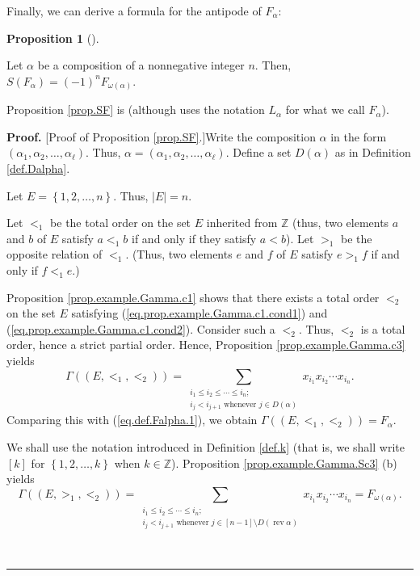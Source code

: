 \documentclass[numbers=enddot,12pt,final,onecolumn,notitlepage,abstracton]{scrartcl}
\theoremstyle{definition}
\newtheorem{prop}[theo]{Proposition}
\newenvironment{proposition}[1][]
{\begin{prop}[#1]\begin{leftbar}}
{\end{leftbar}\end{prop}}
\newenvironment{proof}[1][Proof]{\noindent\textbf{#1.} }{\ \rule{0.5em}{0.5em}}
\let\sumnonlimits\sum
\renewcommand{\sum}{\sumnonlimits\limits}
\newenvironment{verlong}{}{}
\begin{document}
\begin{verlong}
\begin{footnotesize}
Finally, we can derive a formula for the antipode of $F_{\alpha}$:

\begin{proposition}
\label{prop.SF}Let $\alpha$ be a composition of a nonnegative integer $n$.
Then, $S\left(  F_{\alpha}\right)  =\left(  -1\right)  ^{n}F_{\omega\left(
\alpha\right)  }$.
\end{proposition}

Proposition \ref{prop.SF} is \cite[(5.2.7)]{Reiner} (although \cite{Reiner} uses
the notation $L_{\alpha}$ for what we call $F_{\alpha}$).

\begin{proof}
[Proof of Proposition \ref{prop.SF}.]Write the composition $\alpha$ in the
form $\left(  \alpha_{1},\alpha_{2},\ldots,\alpha_{\ell}\right)  $. Thus,
$\alpha=\left(  \alpha_{1},\alpha_{2},\ldots,\alpha_{\ell}\right)  $. Define a
set $D\left(  \alpha\right)  $ as in Definition \ref{def.Dalpha}.

Let $E=\left\{  1,2,\ldots,n\right\}  $. Thus, $\left\vert E\right\vert =n$.

Let $<_{1}$ be the total order on the set $E$ inherited from $\mathbb{Z}$
(thus, two elements $a$ and $b$ of $E$ satisfy $a<_{1}b$ if and only if they
satisfy $a<b$). Let $>_{1}$ be the opposite relation of $<_{1}$. (Thus, two
elements $e$ and $f$ of $E$ satisfy $e>_{1}f$ if and only if $f<_{1}e$.)

Proposition \ref{prop.example.Gamma.c1} shows that there exists a total order
$<_{2}$ on the set $E$ satisfying (\ref{eq.prop.example.Gamma.c1.cond1}) and
(\ref{eq.prop.example.Gamma.c1.cond2}). Consider such a $<_{2}$. Thus, $<_{2}$
is a total order, hence a strict partial order. Hence, Proposition
\ref{prop.example.Gamma.c3} yields%
\[
\Gamma\left(  \left(  E,<_{1},<_{2}\right)  \right)  =\sum_{\substack{i_{1}%
\leq i_{2}\leq\cdots\leq i_{n};\\i_{j}<i_{j+1}\text{ whenever }j\in D\left(
\alpha\right)  }}x_{i_{1}}x_{i_{2}}\cdots x_{i_{n}}.
\]
Comparing this with (\ref{eq.def.Falpha.1}), we obtain $\Gamma\left(  \left(
E,<_{1},<_{2}\right)  \right)  =F_{\alpha}$.

We shall use the notation introduced in Definition \ref{def.k} (that is, we
shall write $\left[  k\right]  $ for $\left\{  1,2,\ldots,k\right\}  $ when
$k\in\mathbb{Z}$). Proposition \ref{prop.example.Gamma.Sc3} (b) yields%
\[
\Gamma\left(  \left(  E,>_{1},<_{2}\right)  \right)  =\sum_{\substack{i_{1}%
\leq i_{2}\leq\cdots\leq i_{n};\\i_{j}<i_{j+1}\text{ whenever }j\in\left[
n-1\right]  \setminus D\left(  \operatorname*{rev}\alpha\right)  }}x_{i_{1}%
}x_{i_{2}}\cdots x_{i_{n}}=F_{\omega\left(  \alpha\right)  }.
\]



\end{proof}
\end{footnotesize}
\end{verlong}
\end{document}
